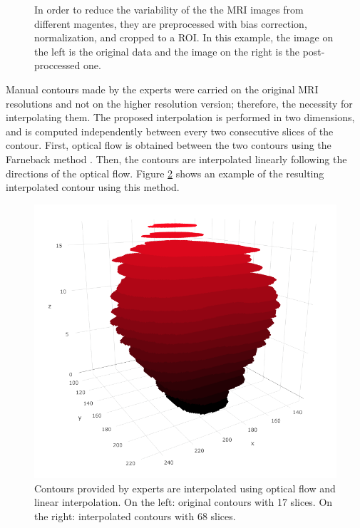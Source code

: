 \begin{figure}[h]
    \caption{In order to reduce the variability of the the MRI images from different
    magentes, they are preprocessed with bias correction, normalization, and cropped to a ROI.
    In this example, the image on the left is the original data and the image on the right
    is the post-proccessed one. }
    \label{fig:roi}
\end{figure}

Manual contours made by the experts were carried on the original MRI
resolutions and not on the higher resolution version; therefore, 
the necessity for interpolating them. 
The proposed interpolation is performed in two dimensions, and
is computed independently between every two consecutive slices of the contour. 
First, optical flow is obtained between the two contours using the  
Farneback method \cite{optflow}. Then, the contours are interpolated linearly following
the directions of the optical flow. Figure \ref{fig:of1} shows an
example of the resulting interpolated contour using this method. 

\begin{figure}[h]
    \centering
    \includegraphics[totalheight=.15\textheight]{imgs/methodology/OF_1.png}
    \caption{Contours provided by experts are interpolated using optical flow and
    linear interpolation. On the left:
    original contours with 17 slices. On the right: interpolated contours with 68 slices.}
    \label{fig:of1}
\end{figure}


